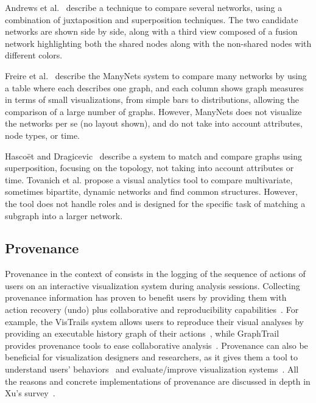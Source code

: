 Andrews et al.~\cite{andrewsVisualGraphComparison2009} describe a technique to compare several networks, using a combination of juxtaposition and superposition techniques.
The two candidate networks are shown side by side, along with a third view composed of a fusion network highlighting both the shared nodes along with the non-shared nodes with different colors.

Freire et al.~\cite{ManyNets} describe the ManyNets system to compare many networks by using a table where each describes one graph, and each column shows graph measures in terms of small visualizations, from simple bars to distributions, allowing the comparison of a large number of graphs. However, ManyNets does not visualize the networks per se (no layout shown), and do not take into account attributes, node types, or time.

Hascoët and Dragicevic~\cite{HascoetD12} describe a system to match and compare graphs using superposition, focusing on the topology, not taking into account attributes or time.
Tovanich et al.\cite{tovanichVAST2020Contest2021} propose a visual analytics tool to compare multivariate, sometimes bipartite, dynamic networks and find common structures.
However, the tool does not handle roles and is designed for the specific task of matching a subgraph into a larger network.

\subsection{Provenance}

Provenance in the context of \va consists in the logging of the sequence of actions of users on an interactive visualization system during analysis sessions.
Collecting provenance information has proven to benefit users by providing them with action recovery (undo) plus collaborative and reproducibility capabilities~\cite{raganCharacterizingProvenanceVisualization2016}.
For example, the VisTrails system allows users to reproduce their visual analyses by providing an executable history graph of their actions~\cite{callahanVisTrailsVisualizationMeets2006}, while GraphTrail provides provenance tools to ease collaborative analysis~\cite{dunneGraphTrailAnalyzingLarge2012}.
Provenance can also be beneficial for visualization designers and researchers, as it gives them a tool to understand users' behaviors~\cite{battleCharacterizingExploratoryVisual2019, borsProvenanceTaskAbstraction2019}
and evaluate/improve visualization systems~\cite{renCharticulatorInteractiveConstruction2019}.
All the reasons and concrete implementations of provenance are discussed in depth in Xu's survey~\cite{xuSurveyAnalysisUser2020}.

